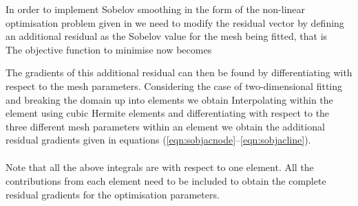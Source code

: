 In order to implement Sobelov smoothing in the form of the non-linear
optimisation problem given in  we need to modify the
residual vector by defining an additional residual as the Sobelov value for
the mesh being fitted, that is
\begin{equation}
  \label{eqn:addSobresidual}
\end{equation}
The objective function to minimise now becomes

The gradients of this additional residual can then be found by differentiating
 with respect to the mesh parameters. Considering the
case of two-dimensional fitting and breaking the domain up into elements we
obtain
Interpolating within the element using cubic Hermite elements and 
differentiating with respect to the three different mesh parameters within
an element we obtain the additional residual gradients given in equations 
(\ref{eqn:sobjacnode}--\ref{eqn:sobjacline}).
\begin{eqnarray}
\end{eqnarray}

Note that all the above integrals are with respect to one element. All the
contributions from each element need to be included to obtain the complete
residual gradients for the optimisation parameters.

